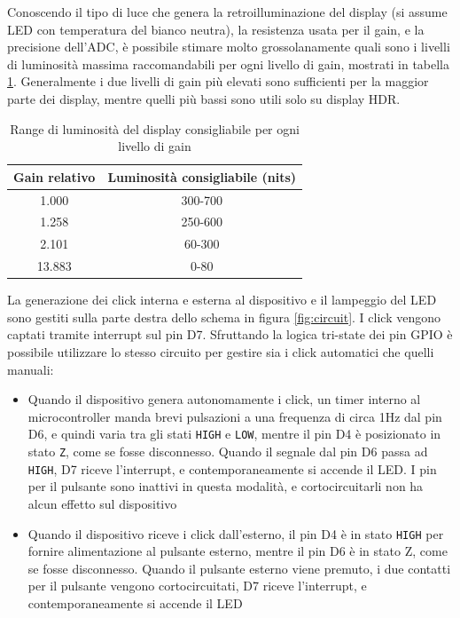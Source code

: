 Conoscendo il tipo di luce che genera la retroilluminazione del display (si assume LED con temperatura del bianco neutra), la resistenza usata per il gain, e la precisione dell'ADC, è possibile stimare molto grossolanamente quali sono i livelli di luminosità massima raccomandabili per ogni livello di gain, mostrati in tabella \ref{tab:pt19_nits}. Generalmente i due livelli di gain più elevati sono sufficienti per la maggior parte dei display, mentre quelli più bassi sono utili solo su display HDR.
\begin{table}
	\centering
	\begin{tabular}{|c|c|} 
		\hline
		\textbf{Gain relativo} & \textbf{Luminosità consigliabile (nits)}  \\ 
		\hline
		1.000 & 300-700         \\ 
		\hline
		1.258 & 250-600         \\ 
		\hline
		2.101 & 60-300         \\ 
		\hline
		13.883 & 0-80          \\
		\hline
	\end{tabular}
	\caption{\label{tab:pt19_nits}Range di luminosità del display consigliabile per ogni livello di gain}
\end{table}

La generazione dei click interna e esterna al dispositivo e il lampeggio del LED sono gestiti sulla parte destra dello schema in figura \ref{fig:circuit}. I click vengono captati tramite interrupt sul pin D7. Sfruttando la logica tri-state dei pin GPIO è possibile utilizzare lo stesso circuito per gestire sia i click automatici che quelli manuali:
\begin{itemize}
	\item Quando il dispositivo genera autonomamente i click, un timer interno al microcontroller manda brevi pulsazioni a una frequenza di circa 1Hz dal pin D6, e quindi varia tra gli stati \texttt{HIGH} e \texttt{LOW}, mentre il pin D4 è posizionato in stato \texttt{Z}, come se fosse disconnesso. Quando il segnale dal pin D6 passa ad \texttt{HIGH}, D7 riceve l'interrupt, e contemporaneamente si accende il LED. I pin per il pulsante sono inattivi in questa modalità, e cortocircuitarli non ha alcun effetto sul dispositivo
	\item Quando il dispositivo riceve i click dall'esterno, il pin D4 è in stato \texttt{HIGH} per fornire alimentazione al pulsante esterno, mentre il pin D6 è in stato Z, come se fosse disconnesso. Quando il pulsante esterno viene premuto, i due contatti per il pulsante vengono cortocircuitati, D7 riceve l'interrupt, e contemporaneamente si accende il LED
\end{itemize}

